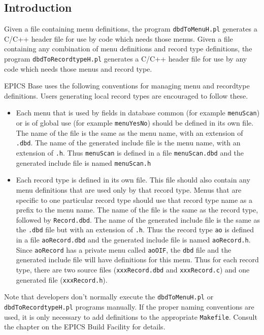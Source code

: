 \subsection{Introduction}

Given a file containing menu definitions, the program \verb|dbdToMenuH.pl| generates a C/C++ header file for use by code which needs those menus.
Given a file containing any combination of menu definitions and record type definitions, the program \verb|dbdToRecordtypeH.pl| generates a C/C++ header file for use by any code which needs those menus and record type.

EPICS Base uses the following conventions for managing menu and recordtype definitions.
Users generating local record types are encouraged to follow these.

\begin{itemize}
\item Each menu that is used by fields in database common (for example \verb|menuScan|) or is of global use (for example \verb|menuYesNo|) should be defined in its own file.
The name of the file is the same as the menu name, with an extension of \verb|.dbd|.
The name of the generated include file is the menu name, with an extension of \verb|.h|.
Thus \verb|menuScan| is defined in a file \verb|menuScan.dbd| and the generated include file is named \verb|menuScan.h|

\item Each record type is defined in its own file.
This file should also contain any menu definitions that are used only by that record type.
Menus that are specific to one particular record type should use that record type name as a prefix to the menu name.
The name of the file is the same as the record type, followed by \verb|Record.dbd|.
The name of the generated include file is the same as the \verb|.dbd| file but with an extension of \verb|.h|.
Thus the record type \verb|ao| is defined in a file \verb|aoRecord.dbd| and the generated include file is named \verb|aoRecord.h|.
Since \verb|aoRecord| has a private menu called \verb|aoOIF|, the \verb|dbd| file and the generated include file will have definitions for this menu.
Thus for each record type, there are two source files (\verb|xxxRecord.dbd| and \verb|xxxRecord.c|) and one generated file (\verb|xxxRecord.h|).
\end{itemize}

Note that developers don't normally execute the \verb|dbdToMenuH.pl| or \verb|dbdToRecordtypeH.pl| programs manually.
If the proper naming conventions are used, it is only necessary to add definitions to the appropriate \verb|Makefile|.
Consult the chapter on the EPICS Build Facility for details.

